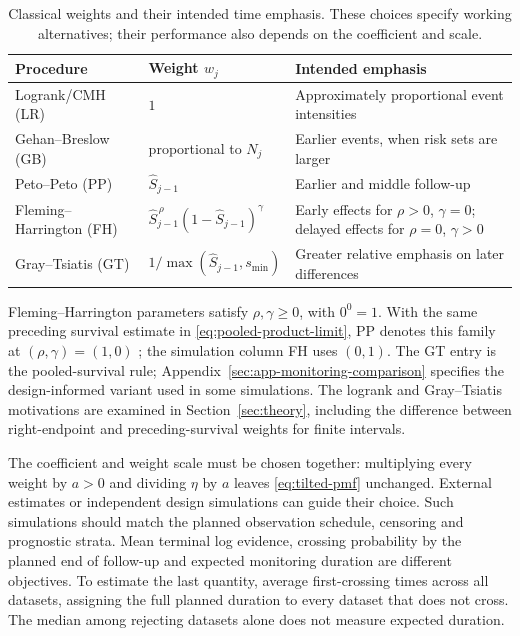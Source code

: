 \documentclass[12pt]{article}
\theoremstyle{definition}
\theoremstyle{remark}
\begin{document}
\begin{table}[tbp]
\centering
\small
\caption{Classical weights and their intended time emphasis. These choices specify working alternatives; their performance also depends on the coefficient and scale.}
\label{tab:weight-guide}
\begin{tabularx}{\textwidth}{>{\raggedright\arraybackslash}p{}>{\raggedright\arraybackslash}p{}>{\raggedright\arraybackslash}X}
\toprule
Procedure & Weight $w_j$ & Intended emphasis\\
\midrule
Logrank/CMH (LR) & $1$ & Approximately proportional event intensities\\
Gehan--Breslow (GB) & proportional to $N_j$ & Earlier events, when risk sets are larger\\
Peto--Peto (PP) & $\widehat S_{j-1}$ & Earlier and middle follow-up\\
Fleming--Harrington (FH) & $\widehat S_{j-1}^{\,\rho}(1-\widehat S_{j-1})^{\gamma}$ & Early effects for $\rho>0$, $\gamma=0$; delayed effects for $\rho=0$, $\gamma>0$\\
Gray--Tsiatis (GT) & $1/\max(\widehat S_{j-1},s_{\min})$ & Greater relative emphasis on later differences\\
\bottomrule
\end{tabularx}
\end{table}
Fleming--Harrington parameters satisfy $\rho,\gamma\geq0$, with $0^0=1$. With the same preceding survival estimate in \eqref{eq:pooled-product-limit}, PP denotes this family at $(\rho,\gamma)=(1,0)$ \citep{HarringtonFleming1982}; the simulation column FH uses $(0,1)$. The GT entry is the pooled-survival rule; Appendix~\ref{sec:app-monitoring-comparison} specifies the design-informed variant used in some simulations. The logrank and Gray--Tsiatis motivations are examined in Section~\ref{sec:theory}, including the difference between right-endpoint and preceding-survival weights for finite intervals.

The coefficient and weight scale must be chosen together: multiplying every weight by $a>0$ and dividing $\eta$ by $a$ leaves \eqref{eq:tilted-pmf} unchanged. External estimates or independent design simulations can guide their choice. Such simulations should match the planned observation schedule, censoring and prognostic strata. Mean terminal log evidence, crossing probability by the planned end of follow-up and expected monitoring duration are different objectives. To estimate the last quantity, average first-crossing times across all datasets, assigning the full planned duration to every dataset that does not cross. The median among rejecting datasets alone does not measure expected duration.
\end{document}
